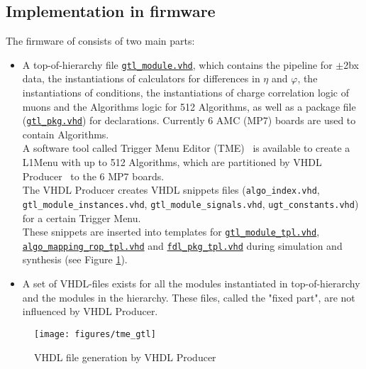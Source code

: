 \clearpage

\subsection{Implementation in firmware}
\label{sec:gtl:implementation_firmware_gtl}

The firmware of \ugtl consists of two main parts:
\begin{itemize}
\item A top-of-hierarchy file \href{\gitbranch/firmware/hdl/payload/gtl\_module\_tpl.vhd}{\texttt{\textquotesingle gtl\_module.vhd\textquotesingle }}, which contains the pipeline for $\pm$2bx data, the instantiations of calculators for differences in $\eta$ and $\varphi$, the instantiations of conditions, the instantiations of charge correlation logic of muons and the Algorithms logic for 512 Algorithms, as well as a package file (\href{\gitbranch/firmware/hdl/packages/gtl\_pkg.vhd}{\texttt{\textquotesingle gtl\_pkg.vhd\textquotesingle }}) for declarations.
Currently 6 AMC (MP7) boards are used to contain Algorithms.\\
A software tool called Trigger Menu Editor (TME)~\cite{TME_repo} is available to create a L1Menu with up to 512 Algorithms, which are partitioned by VHDL Producer~\cite{VHDL_Producer} to the 6 MP7 boards.\\
The VHDL Producer creates VHDL snippets files (\texttt{algo\_index.vhd}, \texttt{gtl\_module\_instances.vhd}, \texttt{gtl\_module\_signals.vhd}, \texttt{ugt\_constants.vhd}) for a certain Trigger Menu.\\
These snippets are inserted into templates for \href{\gitbranch/firmware/hdl/payload/gtl\_module\_tpl.vhd}{\texttt{\textquotesingle gtl\_module\_tpl.vhd\textquotesingle }}, \href{\gitbranch/firmware/hdl/payload/fdl/algo_mapping_rop_tpl.vhd}{\texttt{\textquotesingle algo\_mapping\_rop\_tpl.vhd\textquotesingle }} and \href{\gitbranch/firmware/hdl/packages/fdl_pkg_tpl.vhd}{\texttt{\textquotesingle fdl\_pkg\_tpl.vhd\textquotesingle }} during simulation and synthesis (see Figure \ref{fig:gtl:tme_gtl}).
\item A set of VHDL-files exists for all the modules instantiated in top-of-hierarchy and the modules in the hierarchy. These files, called the "fixed part", are not influenced by VHDL Producer.
\end{itemize}

\begin{figure}[htb]
\centering
\texttt{[image: figures/tme\_gtl]}
\caption{VHDL file generation by VHDL Producer}
\label{fig:gtl:tme_gtl}
\end{figure}

